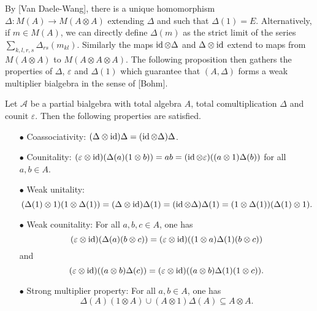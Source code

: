 By [Van Daele-Wang], there is a unique homomorphism $\Delta:M(A)\rightarrow M(A\otimes A)$ extending $\Delta$ and such that $\Delta(1) = E$. Alternatively, if $m\in M(A)$, we can directly define $\Delta(m)$ as the strict limit of the series $\sum_{k,l,r,s} \Delta_{rs}(m_{kl})$. Similarly the maps $\operatorname{id}\otimes \Delta$ and $\Delta\otimes \operatorname{id}$ extend to maps from $M(A\otimes A)$ to $M(A\otimes A\otimes A)$. The following proposition then gathers the properties of $\Delta$, $\varepsilon$ and $\Delta(1)$ which guarantee that $(A,\Delta)$ forms a weak multiplier bialgebra in the sense of [Bohm].

\begin{Prop} Let $\mathscr{A}$ be a partial bialgebra with total algebra $A$, total comultiplication $\Delta$ and counit $\varepsilon$. Then the following properties are satisfied.
\begin{itemize}
\item[$\bullet$] Coassociativity: $(\Delta\otimes \operatorname{id})\Delta = (\operatorname{id}\otimes \Delta)\Delta$.
\item[$\bullet$] Counitality: $(\varepsilon\otimes \operatorname{id})(\Delta(a)(1\otimes b)) = ab = (\operatorname{id}\otimes \varepsilon)((a\otimes 1)\Delta(b))$ for all $a,b\in A$.
\item[$\bullet$] Weak unitality: \[(\Delta(1)\otimes 1)(1\otimes \Delta(1)) = (\Delta\otimes \operatorname{id})\Delta(1) = (\operatorname{id}\otimes \Delta)\Delta(1) = (1\otimes \Delta(1))(\Delta(1)\otimes 1).\]
\item[$\bullet$] Weak counitality: For all $a,b,c\in A$, one has \[(\varepsilon\otimes \operatorname{id})(\Delta(a)(b\otimes c)) = (\varepsilon\otimes \operatorname{id})((1\otimes a)\Delta(1)(b\otimes c))\] and 
\[(\varepsilon\otimes \operatorname{id})((a\otimes b)\Delta(c)) = (\varepsilon\otimes \operatorname{id})((a\otimes b)\Delta(1)(1\otimes c)).\]
\item[$\bullet$] Strong multiplier property: For all $a,b\in A$, one has \[\Delta(A)(1\otimes A)\cup (A\otimes 1)\Delta(A)\subseteq  A\otimes A.\] 
\end{itemize}
\end{Prop}

